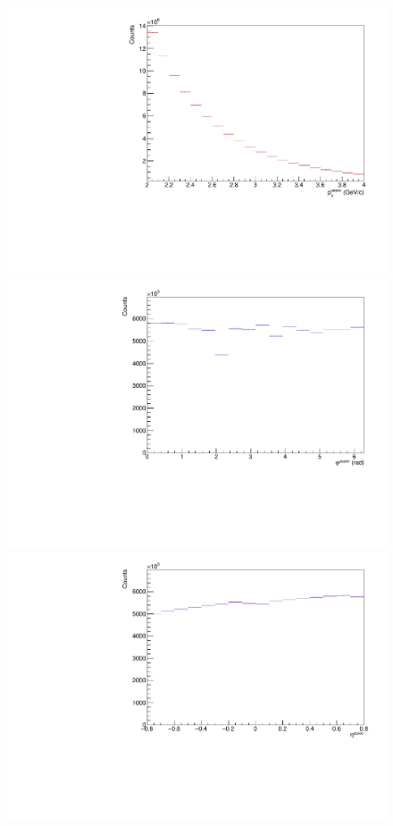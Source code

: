 \begin{figure}[t!]
	\centering
	\begin{minipage}{0.32\textwidth}
		\includegraphics[width=\textwidth]{figures/analysis/assoc_pt_dist_0_20.pdf}
	\end{minipage}
	\begin{minipage}{0.32\textwidth}
		\includegraphics[width=\textwidth]{figures/analysis/assoc_phi_dist_0_20.pdf}
	\end{minipage}
	\begin{minipage}{0.32\textwidth}
		\includegraphics[width=\textwidth]{figures/analysis/assoc_eta_dist_0_20.pdf}

\end{minipage}
\end{figure}
